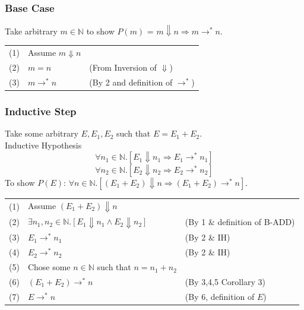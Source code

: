 \subsubsection*{Base Case}
Take arbitrary $m \in \mathbb{N}$ to show $P(m)$ = $m \Downarrow n \Rightarrow m \to^* n$.
\begin{center}
	\begin{tabular}{l l l}
		(1) & Assume $m \Downarrow n$ &                                  \\
		(2) & $m = n$                 & (From Inversion of $\Downarrow$) \\
		(3) & $m \to^* n$             & (By 2 and definition of $\to^*$) \\
	\end{tabular}
\end{center}
\subsubsection*{Inductive Step}
Take some arbitrary $E, E_1, E_2$ such that $E = E_1 + E_2$.
\\ Inductive Hypothesis
\[\forall n_1 \in \mathbb{N} . [E_1 \Downarrow n_1 \Rightarrow E_1 \to^* n_1]\]
\[\forall n_2 \in \mathbb{N} . [E_2 \Downarrow n_2 \Rightarrow E_2 \to^* n_2]\]
To show $P(E)$: $\forall n \in \mathbb{N} . [(E_1 + E_2) \Downarrow n \Rightarrow (E_1 + E_2) \to^* n]$.
\begin{center}
	\begin{tabular}{l l l}
		(1) & Assume $(E_1 + E_2) \Downarrow n$                                                 &                               \\
		(2) & $\exists n_1, n_2 \in \mathbb{N} . [E_1 \Downarrow n_1 \land E_2 \Downarrow n_2]$ & (By 1 \& definition of B-ADD) \\
		(3) & $E_1 \to^* n_1$                                                                   & (By 2 \& IH)                  \\
		(4) & $E_2 \to^* n_2$                                                                   & (By 2 \& IH)                  \\
		(5) & Chose some $n \in \mathbb{N}$ such that $n = n_1 + n_2$                           &                               \\
		(6) & $(E_1 + E_2) \to^* n$                                                             & (By 3,4,5 Corollary 3)        \\
		(7) & $E \to^* n$                                                                       & (By 6, definition of $E$)     \\
	\end{tabular}
\end{center}

